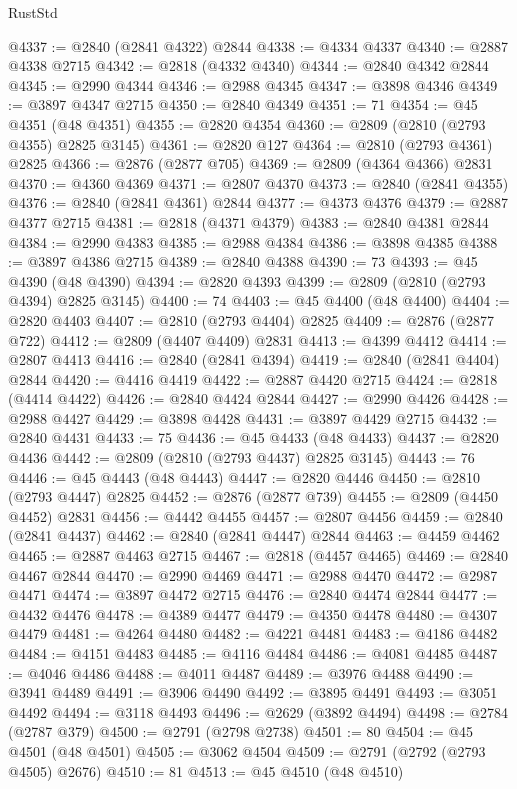 \begin{lexlean}{RustStd}
\begin{coremodule}
@4337 := @2840 (@2841 @4322) @2844
@4338 := @4334 @4337
@4340 := @2887 @4338 @2715
@4342 := @2818 (@4332 @4340)
@4344 := @2840 @4342 @2844
@4345 := @2990 @4344
@4346 := @2988 @4345
@4347 := @3898 @4346
@4349 := @3897 @4347 @2715
@4350 := @2840 @4349
@4351 := 71
@4354 := @45 @4351 (@48 @4351)
@4355 := @2820 @4354
@4360 := @2809 (@2810 (@2793 @4355) @2825 @3145)
@4361 := @2820 @127
@4364 := @2810 (@2793 @4361) @2825
@4366 := @2876 (@2877 @705)
@4369 := @2809 (@4364 @4366) @2831
@4370 := @4360 @4369
@4371 := @2807 @4370
@4373 := @2840 (@2841 @4355)
@4376 := @2840 (@2841 @4361) @2844
@4377 := @4373 @4376
@4379 := @2887 @4377 @2715
@4381 := @2818 (@4371 @4379)
@4383 := @2840 @4381 @2844
@4384 := @2990 @4383
@4385 := @2988 @4384
@4386 := @3898 @4385
@4388 := @3897 @4386 @2715
@4389 := @2840 @4388
@4390 := 73
@4393 := @45 @4390 (@48 @4390)
@4394 := @2820 @4393
@4399 := @2809 (@2810 (@2793 @4394) @2825 @3145)
@4400 := 74
@4403 := @45 @4400 (@48 @4400)
@4404 := @2820 @4403
@4407 := @2810 (@2793 @4404) @2825
@4409 := @2876 (@2877 @722)
@4412 := @2809 (@4407 @4409) @2831
@4413 := @4399 @4412
@4414 := @2807 @4413
@4416 := @2840 (@2841 @4394)
@4419 := @2840 (@2841 @4404) @2844
@4420 := @4416 @4419
@4422 := @2887 @4420 @2715
@4424 := @2818 (@4414 @4422)
@4426 := @2840 @4424 @2844
@4427 := @2990 @4426
@4428 := @2988 @4427
@4429 := @3898 @4428
@4431 := @3897 @4429 @2715
@4432 := @2840 @4431
@4433 := 75
@4436 := @45 @4433 (@48 @4433)
@4437 := @2820 @4436
@4442 := @2809 (@2810 (@2793 @4437) @2825 @3145)
@4443 := 76
@4446 := @45 @4443 (@48 @4443)
@4447 := @2820 @4446
@4450 := @2810 (@2793 @4447) @2825
@4452 := @2876 (@2877 @739)
@4455 := @2809 (@4450 @4452) @2831
@4456 := @4442 @4455
@4457 := @2807 @4456
@4459 := @2840 (@2841 @4437)
@4462 := @2840 (@2841 @4447) @2844
@4463 := @4459 @4462
@4465 := @2887 @4463 @2715
@4467 := @2818 (@4457 @4465)
@4469 := @2840 @4467 @2844
@4470 := @2990 @4469
@4471 := @2988 @4470
@4472 := @2987 @4471
@4474 := @3897 @4472 @2715
@4476 := @2840 @4474 @2844
@4477 := @4432 @4476
@4478 := @4389 @4477
@4479 := @4350 @4478
@4480 := @4307 @4479
@4481 := @4264 @4480
@4482 := @4221 @4481
@4483 := @4186 @4482
@4484 := @4151 @4483
@4485 := @4116 @4484
@4486 := @4081 @4485
@4487 := @4046 @4486
@4488 := @4011 @4487
@4489 := @3976 @4488
@4490 := @3941 @4489
@4491 := @3906 @4490
@4492 := @3895 @4491
@4493 := @3051 @4492
@4494 := @3118 @4493
@4496 := @2629 (@3892 @4494)
@4498 := @2784 (@2787 @379)
@4500 := @2791 (@2798 @2738)
@4501 := 80
@4504 := @45 @4501 (@48 @4501)
@4505 := @3062 @4504
@4509 := @2791 (@2792 (@2793 @4505) @2676)
@4510 := 81
@4513 := @45 @4510 (@48 @4510)

\end{coremodule}
\end{lexlean}
